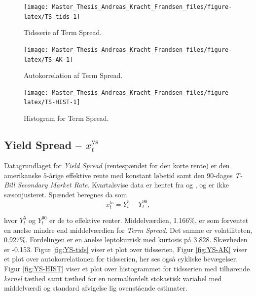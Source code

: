 \documentclass[
  a4paper,
  oneside]{memoir}
\begin{document}
\begin{figure}[H]

{\centering \texttt{[image: Master\_Thesis\_Andreas\_Kracht\_Frandsen\_files/figure-latex/TS-tids-1]} 

}

\caption{Tidsserie af Term Spread.}\label{fig:TS-tids}
\end{figure}

\begin{figure}[H]

{\centering \texttt{[image: Master\_Thesis\_Andreas\_Kracht\_Frandsen\_files/figure-latex/TS-AK-1]} 

}

\caption{Autokorrelation af Term Spread.}\label{fig:TS-AK}
\end{figure}

\begin{figure}[H]

{\centering \texttt{[image: Master\_Thesis\_Andreas\_Kracht\_Frandsen\_files/figure-latex/TS-HIST-1]} 

}

\caption{Histogram for Term Spread.}\label{fig:TS-HIST}
\end{figure}

\hypertarget{yield-spread-x_ttextys}{%
\subsection{\texorpdfstring{Yield Spread -- \(x_t^{\text{ys}}\)}{Yield Spread -- x\_t\^{}\{\textbackslash text\{ys\}\}}}\label{yield-spread-x_ttextys}}

Datagrundlaget for \emph{Yield Spread} (rentespændet for den korte rente) er den amerikanske \(5\)-årige effektive rente med konstant løbetid samt den 90-dages \emph{T-Bill} \emph{Secondary Market Rate}. Kvartalsvise data er hentet fra \citep{FRED52020} og \citep{FRED902020}, og er ikke sæsonjusteret. Spændet beregnes da som
\[x_t^{\text{ts}}=Y_t^{5}-Y_t^{90},\]

hvor \(Y_t^{5}\) og \(Y_t^{90}\) er de to effektive renter. Middelværdien, 1.166\(\%\), er som forventet en anelse mindre end middelværdien for \emph{Term Spread}. Det samme er volatiliteten, 0.927\(\%\). Fordelingen er en anelse leptokurtisk med kurtosis på 3.828. Skævheden er -0.153. Figur \ref{fig:YS-tids} viser et plot over tidsserien, Figur \ref{fig:YS-AK} viser et plot over autokorrelationen for tidsserien, her ses også cykliske bevægelser. Figur \ref{fig:YS-HIST} viser et plot over histogrammet for tidsserien med tilhørende \emph{kernel} tæthed samt tæthed for en normalfordelt stokastisk variabel med middelværdi og standard afvigelse lig ovenstående estimater.
\end{document}
